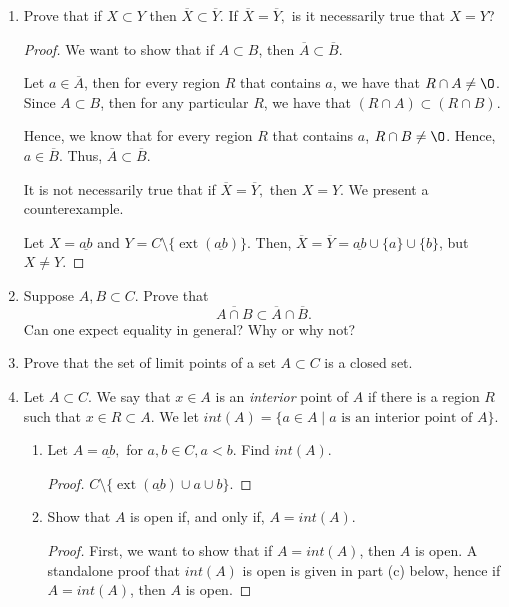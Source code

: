 \documentclass[11pt]{article}
\renewcommand{\emptyset}{\O}
\renewcommand{\_}[1]{\underline{ #1 }}
\DeclareMathOperator{\ext}{ext}
\theoremstyle{definition}
\numberwithin{equation}{subsection}
\begin{document}
\begin{enumerate}
\item Prove that if $X\subset Y$ then $\overline{X}\subset \overline{Y}.$ If $\overline{X}=\overline{Y},$ is it necessarily true that $X=Y$?

\begin{proof}
We want to show that if $A \subset B$, then $\overline{A} \subset \overline{B}$. 

Let $a \in \overline{A}$, then for every region $R$ that contains $a$, we have that $R \cap A \neq \emptyset$. Since $A \subset B$, then for any particular $R$, we have that $(R \cap A) \subset (R \cap B)$.

Hence, we know that for every region $R$ that contains $a$, $R \cap B \neq \emptyset$. Hence, $a \in \overline{B}$. Thus, $\overline{A} \subset \overline{B}$.


It is not necessarily true that if $\overline{X}=\overline{Y},$ then $X = Y$. We present a counterexample.

Let $X = \_{ab}$ and $Y = C \setminus \{\ext(\_{ab})\}$. Then, $\overline{X}=\overline{Y} = \_{ab} \cup \{a\} \cup \{b\}$, but $X \neq Y$.

\renewcommand\qedsymbol{QED}
\end{proof}

\item Suppose $A,B\subset C.$  Prove
that 
\[ \overline{A\cap B}\subset\overline{A}\cap\overline{B}.\]  Can one expect
equality in general?  Why or why not?

\item Prove that the set of limit points of a set $A\subset C$ is a closed set.

\item Let $A\subset C.$ We say that $x\in A$ is an {\it interior} point of $A$ if there is a region $R$ such that $x\in R\subset A.$  We let $int(A)=\{a\in A\mid a\text{ is an interior point of }A\}.$
\begin{enumerate}
\item Let $A=\underline{ab},$ for $a,b\in C, a<b.$ Find $int(A).$
\begin{proof}

$C \setminus \{\ext(\_{ab}) \cup a \cup b\}.$
\renewcommand\qedsymbol{QED}
\end{proof}
\item Show that $A$ is open if, and only if, $A=int(A).$
\begin{proof}
First, we want to show that if $A = int(A)$, then $A$ is open. A standalone proof that $int(A)$ is open is given in part (c) below, hence if $A = int(A)$, then $A$ is open.


\end{proof}
\end{enumerate}
\end{enumerate}
\end{document}
